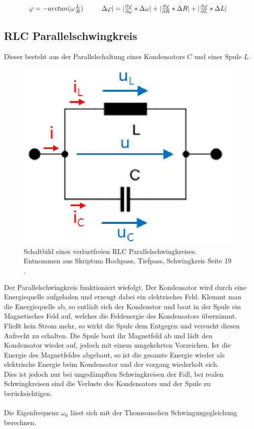 \documentclass[12pt,a4paper,twoside]{article}
\begin{document}
\begin{equation}
    \label{eq:Phasengang LR-TP}
    \centerline{$\varphi = -arctan( \omega \frac{L}{R})$ \\ $\Delta \varphi \vert = \vert \frac{\partial \varphi}{\partial \omega} * \Delta \omega \vert + \vert \frac{\partial \varphi}{\partial R} * \Delta R \vert + \vert \frac{\partial \varphi}{\partial L} * \Delta L \vert$}
\end{equation}

\subsection{RLC Parallelschwingkreis}
Dieser besteht aus der Parallelschaltung eines Kondensators $C$ und einer Spule $L$. 

\begin{figure}[H]
    \centering
    \includegraphics[width=0.6\linewidth]{nudes/RLCparallel.jpg}
    \caption{Schaltbild eines verlustfreien RLC Parallelschwingkreises. Entnommen aus Skriptum Hochpass, Tiefpass, Schwingkreis Seite 19 \cite{teachcenter2}. }
    \label{fig:grundParallel}
\end{figure}

\noindent
Der Parallelschwingkreis funktioniert wiefolgt. Der Kondensator wird durch eine Energiequelle aufgeladen und erzeugt dabei ein elektrisches Feld. 
Klemmt man die Energiequelle ab, so entlädt sich der Kondenstor und baut in der Spule ein Magnetisches Feld auf, welches die Feldenergie des Kondensators übernimmt. Fließt kein Strom mehr, so wirkt die Spule dem Entgegen und versucht diesen Aufrecht zu erhalten. 
Die Spule baut ihr Magnetfeld ab und lädt den Kondensator wieder auf, jedoch mit einem umgekehrten Vorzeichen. Ist die Energie des Magnetfeldes abgebaut, so ist die gesamte Energie wieder als elektrische Energie beim Kondensator und der vorgang wiederholt sich. 
\\
Dies ist jedoch nur bei ungedämpften Schwingkreisen der Fall, bei realen Schwingkreisen sind die Verluste des Kondensators und der Spule zu berücksichtigen. 
\\
\\
Die Eigenfrequenz $\omega_0$ lässt sich mit der Thomsonschen Schwingungsgleichung berechnen. 
\end{document}
